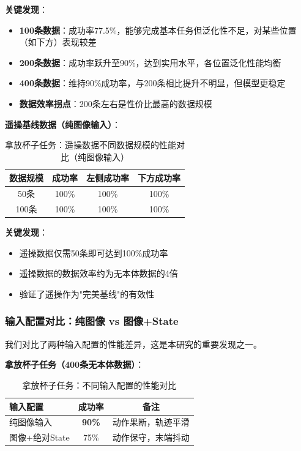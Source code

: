 \textbf{关键发现}：
\begin{itemize}[leftmargin=2em]
    \item \textbf{100条数据}：成功率77.5\%，能够完成基本任务但泛化性不足，对某些位置（如下方）表现较差
    \item \textbf{200条数据}：成功率跃升至90\%，达到实用水平，各位置泛化性能均衡
    \item \textbf{400条数据}：维持90\%成功率，与200条相比提升不明显，但模型更稳定
    \item \textbf{数据效率拐点}：200条左右是性价比最高的数据规模
\end{itemize}

\textbf{遥操基线数据（纯图像输入）}：

\begin{table}[htbp]
\centering
\caption{拿放杯子任务：遥操数据不同数据规模的性能对比（纯图像输入）}
\label{tab:data_scale_cup_teleop}
\begin{tabular}{cccc}
\toprule
数据规模 & 成功率 & 左侧成功率 & 下方成功率 \\
\midrule
50条 & 100\% & 100\% & 100\% \\
100条 & 100\% & 100\% & 100\% \\
\bottomrule
\end{tabular}
\end{table}

\textbf{关键发现}：
\begin{itemize}[leftmargin=2em]
    \item 遥操数据仅需50条即可达到100\%成功率
    \item 遥操数据的数据效率约为无本体数据的4倍
    \item 验证了遥操作为"完美基线"的有效性
\end{itemize}

\subsubsection{输入配置对比：纯图像 vs 图像+State}

我们对比了两种输入配置的性能差异，这是本研究的重要发现之一。

\textbf{拿放杯子任务（400条无本体数据）}：

\begin{table}[htbp]
\centering
\caption{拿放杯子任务：不同输入配置的性能对比}
\label{tab:input_config_cup}
\begin{tabular}{lcc}
\toprule
输入配置 & 成功率 & 备注 \\
\midrule
纯图像输入 & \textbf{90\%} & 动作果断，轨迹平滑 \\
图像+绝对State & 75\% & 动作保守，末端抖动 \\
\bottomrule
\end{tabular}
\end{table}

